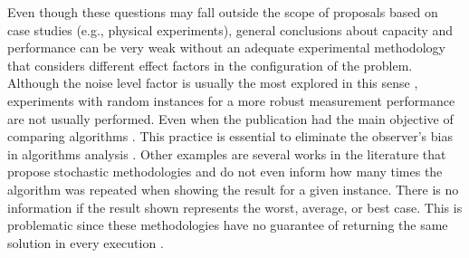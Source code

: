 		Even though these questions may fall outside the scope of proposals based on case studies (e.g., physical experiments), general conclusions about capacity and performance can be very weak without an adequate experimental methodology that considers different effect factors in the configuration of the problem. Although the noise level factor is usually the most explored in this sense \citep{chew1990reconstruction,chen2010subspace,shah2018fast,batista2021quadratic}, experiments with random instances for a more robust measurement performance are not usually performed. Even when the publication had the main objective of comparing algorithms \citep{moghaddam1991comparison,gilmore2009comparison,pan2010comparison}. This practice is essential to eliminate the observer's bias in algorithms analysis \citep{montgomery2010applied}. Other examples are several works in the literature that propose stochastic methodologies and do not even inform how many times the algorithm was repeated when showing the result for a given instance. There is no information if the result shown represents the worst, average, or best case. This is problematic since these methodologies have no guarantee of returning the same solution in every execution \citep{massa2005parallel,ashtari2010using,salucci2017multifrequency}.
		
